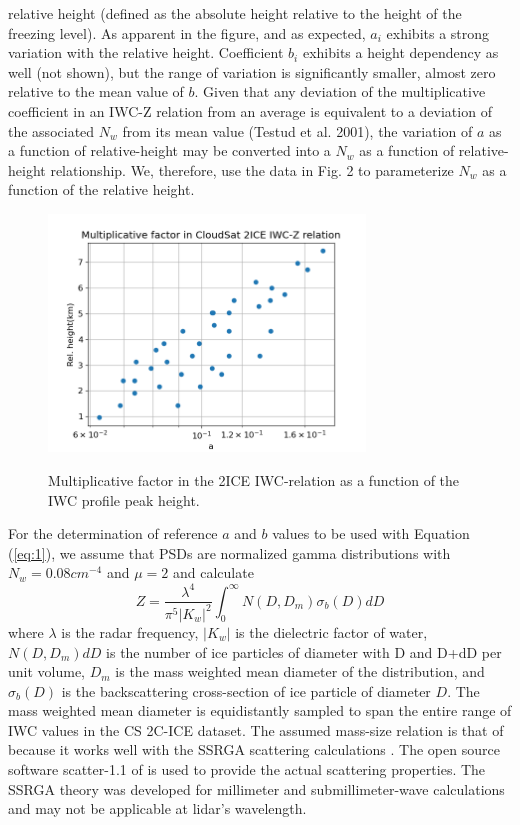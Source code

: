\documentclass{ametsocV6.1}
\begin{document}
relative height (defined as the absolute height relative to the height of the freezing
level).  As 
apparent in the figure, and as expected, $a_i$ exhibits a strong variation with the relative height. 
Coefficient $b_i$ exhibits a height dependency as well (not shown), but the range of variation is significantly
smaller, 
almost zero relative to the mean value of $b$. Given that any deviation of the multiplicative coefficient in 
an IWC-Z relation from an average is equivalent to a deviation of the associated $N_w$ from its mean value 
(Testud et al. 2001), the variation of $a$ as a function of relative-height may be converted into a $N_w$ 
as a function of relative-height relationship.  We, therefore, use the data in Fig. 2 to parameterize $N_w$ as a 
function of the relative height.

\begin{figure}[t]
    \centering
    \includegraphics[width=0.75\textwidth,angle=0]{./Figs/fig02.png}\\
    \caption{Multiplicative factor in the 2ICE IWC-relation as a function of the IWC profile
    peak height.}\label{f2}
\end{figure}

For the determination of reference $a$ and $b$ values to be used with Equation (\ref{eq:1}), we assume that 
PSDs are normalized gamma  distributions with $N_w=0.08cm^{-4}$ and $\mu=2$ and calculate 
\begin{equation}
 Z=\frac {\lambda ^4} {\pi ^5 |K_w|^2} \int_0^{\infty} N(D,D_m) \sigma _b(D) dD
\end{equation}
where $\lambda$ is the radar frequency, $|K_w|$ is the dielectric factor of water, $N(D,D_m) dD$ is the number 
of ice particles of diameter with D and D+dD per unit volume, $D_m$ is the mass weighted mean diameter of the 
distribution, and $\sigma _b(D)$ is the backscattering cross-section of ice particle of diameter $D$. The mass 
weighted mean diameter is equidistantly sampled to span the entire range of IWC values in the CS 2C-ICE dataset.
The assumed mass-size relation is that of \cite{brown1995improved} because it works well with the 
SSRGA scattering calculations \citep{heymsfield2022impacts}.  The open source software scatter-1.1 of \citep{scatter-1.1}
is used to provide the actual scattering properties. The SSRGA theory was developed for millimeter and 
submillimeter-wave calculations and may not be applicable at lidar's wavelength.  
\end{document}
